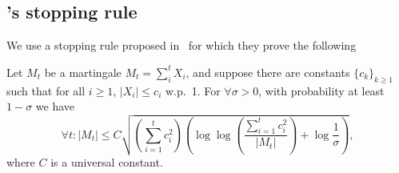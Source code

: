 \subsection{\Sparrow's stopping rule} \label{sec:balsubramani}

We use a stopping rule proposed in~\cite{balsubramani_sharp_2014}
for which they prove the following

\begin{theorem} \label{thm:balsubramani}
  Let $M_t$ be a martingale $M_t = \sum_i^t X_i$,
  and suppose there are constants $\{c_k\}_{k \geq 1}$ such that
  for all $i \geq 1$, $|X_i| \leq c_i$ w.p.\ 1.
  For $\forall \sigma > 0$, with probability at least $1 - \sigma$ we have
  \[
  \forall t: |M_t| \leq C \sqrt{
    \left( \sum_{i=1}^t c_i^2 \right)
    \left( \log \log \left( \frac{ \sum_{i=1}^t c_i^2 }{ |M_t| }\right) +
    \log \frac{1}{\sigma} \right)
  },
  \]
  where $C$ is a universal constant.
\end{theorem}

